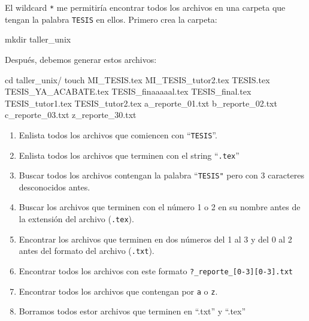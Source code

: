 \documentclass[
  spanish,
  12pt,
  letterpaper,
  DIV=11,
  numbers=noendperiod]{scrreprt}
\newenvironment{Shaded}{\begin{snugshade}}{\end{snugshade}}
\newcommand{\BuiltInTok}[1]{\textcolor[rgb]{0.00,0.23,0.31}{#1}}
\newcommand{\FunctionTok}[1]{\textcolor[rgb]{0.28,0.35,0.67}{#1}}
\newcommand{\NormalTok}[1]{\textcolor[rgb]{0.00,0.23,0.31}{#1}}
\begin{document}
\begin{tcolorbox}[enhanced jigsaw, arc=.35mm, bottomrule=.15mm, bottomtitle=1mm, breakable, colback=white, colbacktitle=quarto-callout-note-color!10!white, colframe=quarto-callout-note-color-frame, coltitle=black, left=2mm, leftrule=.75mm, opacityback=0, opacitybacktitle=0.6, rightrule=.15mm, title=\textcolor{quarto-callout-note-color}{\faInfo}\hspace{0.5em}{Ejercicio 3}, titlerule=0mm, toprule=.15mm, toptitle=1mm]

El wildcard \texttt{*} me permitiría encontrar todos los archivos en una
carpeta que tengan la palabra \texttt{TESIS} en ellos. Primero crea la
carpeta:

\begin{Shaded}
\begin{Highlighting}[]
\FunctionTok{mkdir}\NormalTok{ taller\_unix}
\end{Highlighting}
\end{Shaded}

Después, debemos generar estos archivos:

\begin{Shaded}
\begin{Highlighting}[]
\BuiltInTok{cd}\NormalTok{ taller\_unix/}
\FunctionTok{touch}\NormalTok{ MI\_TESIS.tex MI\_TESIS\_tutor2.tex TESIS.tex TESIS\_YA\_ACABATE.tex TESIS\_finaaaaal.tex TESIS\_final.tex TESIS\_tutor1.tex TESIS\_tutor2.tex a\_reporte\_01.txt b\_reporte\_02.txt c\_reporte\_03.txt z\_reporte\_30.txt }
\end{Highlighting}
\end{Shaded}

\begin{enumerate}
\def\labelenumi{\arabic{enumi}.}
\item
  Enlista todos los archivos que comiencen con ``\texttt{TESIS}''.
\item
  Enlista todos los archivos que terminen con el string
  ``\texttt{.tex}''
\item
  Buscar todos los archivos contengan la palabra ``\texttt{TESIS"} pero
  con 3 caracteres desconocidos antes.
\item
  Buscar los archivos que terminen con el número 1 o 2 en su nombre
  antes de la extensión del archivo (\texttt{.tex}).
\item
  Encontrar los archivos que terminen en dos números del 1 al 3 y del 0
  al 2 antes del formato del archivo (\texttt{.txt}).
\item
  Encontrar todos los archivos con este formato
  \texttt{?\_reporte\_{[}0-3{]}{[}0-3{]}.txt}
\item
  Encontrar todos los archivos que contengan por \texttt{a} o
  \texttt{z}.
\item
  Borramos todos estor archivos que terminen en ``.txt'' y ``.tex''


\end{enumerate}
\end{tcolorbox}
\end{document}
